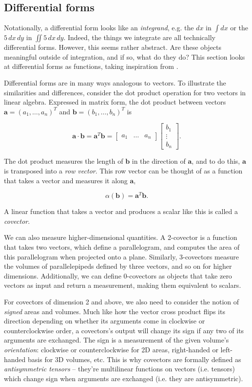 \documentclass[utf8,english]{gradu3}
\begin{document}
\subsection{Differential forms}

Notationally, a differential form looks like an \textit{integrand},
e.g. the $dx$ in $\int dx$ or the $5\,dx\,dy$ in $\iint 5\,dx\,dy$.
Indeed, the things we integrate are all technically differential forms.
However, this seems rather abstract.
Are these objects meaningful outside of integration,
and if so, what do they do?
This section looks at differential forms as functions,
taking inspiration from \textcite{crane_digital_2013}.

Differential forms are in many ways analogous to vectors.
To illustrate the similarities and differences,
consider the dot product operation
for two vectors in linear algebra.
Expressed in matrix form, the dot product between vectors
$\mathbf{a} = (a_1, \dots, a_n)^T$ and $\mathbf{b} = (b_1, \dots, b_n)^T$
is

\[
  \mathbf{a} \cdot \mathbf{b} = \mathbf{a}^T \mathbf{b}
  = \begin{bmatrix}
    a_1 & \dots & a_n
  \end{bmatrix}
  \begin{bmatrix}
    b_1 \\ \vdots \\ b_n
  \end{bmatrix}.
\]

The dot product measures the length of $\mathbf{b}$ in the direction of $\mathbf{a}$,
and to do this, $\mathbf{a}$ is transposed into a \textit{row vector}.
This row vector can be thought of as a function
that takes a vector and measures it along $\mathbf{a}$,

\[
  \alpha(\mathbf{b}) = \mathbf{a}^T \mathbf{b}.
\]

A linear function that takes a vector and produces a scalar like this
is called a \textit{covector}.

We can also measure higher-dimensional quantities.
A 2-covector is a function that takes two vectors,
which define a parallelogram,
and computes the area of this parallelogram
when projected onto a plane.
Similarly, 3-covectors measure the volumes of parallelepipeds
defined by three vectors, and so on for higher dimensions.
Additionally, we can define 0-covectors
as objects that take zero vectors as input and return a measurement,
making them equivalent to scalars.

For covectors of dimension 2 and above, we also need to consider
the notion of \textit{signed} areas and volumes.
Much like how the vector cross product flips its direction
depending on whether its arguments come in clockwise or counterclockwise order,
a covectors's output will change its sign
if any two of its arguments are exchanged.
The sign is a measurement of the given volume's \textit{orientation}:
clockwise or counterclockwise for 2D areas,
right-handed or left-handed basis for 3D volumes, etc.
This is why covectors are formally defined as \textit{antisymmetric tensors}
-- they're multilinear functions on vectors (i.e. tensors)
which change sign when arguments are exchanged (i.e. they are antisymmetric).
\end{document}
